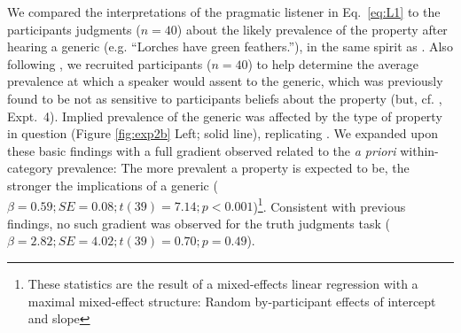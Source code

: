 \documentclass[10pt,letterpaper]{article}
\begin{document}
We compared the interpretations of the pragmatic listener in Eq.~\ref{eq:L1} to the participants judgments ($n=40$) about the likely prevalence of the property after hearing a generic (e.g. ``Lorches have green feathers.''), in the same spirit as . 
Also following , we recruited participants ($n=40$) to help determine the average prevalence at which a speaker would assent to the generic, which was previously found to be not as sensitive to participants beliefs about the property (but, cf. , Expt.~4).
Implied prevalence of the generic was affected by the type of property in question (Figure \ref{fig:exp2b} Left; solid line), replicating . 
We expanded upon these basic findings with a full gradient observed related to the \emph{a priori} within-category prevalence: The more prevalent a property is expected to be, the stronger the implications of a generic ($\beta = 0.59; SE = 0.08; t(39) = 7.14; p < 0.001$)\footnote{These statistics are the result of a mixed-effects linear regression with a maximal mixed-effect structure: Random by-participant effects of intercept and slope}. 
Consistent with previous findings, no such gradient was observed for the truth judgments task ($\beta = 2.82; SE = 4.02; t(39) = 0.70; p = 0.49$).

\end{document}

